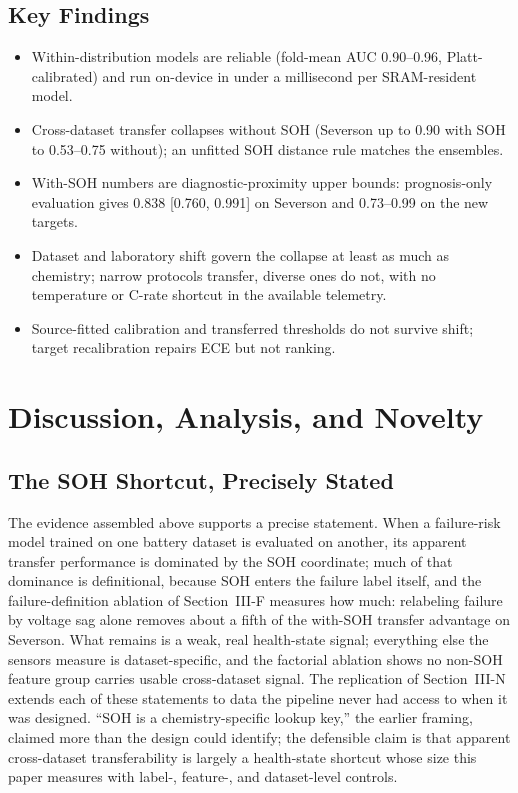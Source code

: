 \documentclass[preprint,12pt]{elsarticle}
\begin{document}
\subsection{Key Findings}
\begin{itemize}
\item Within-distribution models are reliable (fold-mean AUC 0.90--0.96, Platt-calibrated) and run on-device in under a millisecond per SRAM-resident model.
\item Cross-dataset transfer collapses without SOH (Severson up to 0.90 with SOH to 0.53--0.75 without); an unfitted SOH distance rule matches the ensembles.
\item With-SOH numbers are diagnostic-proximity upper bounds: prognosis-only evaluation gives 0.838 [0.760, 0.991] on Severson and 0.73--0.99 on the new targets.
\item Dataset and laboratory shift govern the collapse at least as much as chemistry; narrow protocols transfer, diverse ones do not, with no temperature or C-rate shortcut in the available telemetry.
\item Source-fitted calibration and transferred thresholds do not survive shift; target recalibration repairs ECE but not ranking.
\end{itemize}

\section{Discussion, Analysis, and Novelty}

\subsection{The SOH Shortcut, Precisely Stated}
The evidence assembled above supports a precise statement. When a failure-risk model trained on one battery dataset is evaluated on another, its apparent transfer performance is dominated by the SOH coordinate; much of that dominance is definitional, because SOH enters the failure label itself, and the failure-definition ablation of Section~III-F measures how much: relabeling failure by voltage sag alone removes about a fifth of the with-SOH transfer advantage on Severson. What remains is a weak, real health-state signal; everything else the sensors measure is dataset-specific, and the factorial ablation shows no non-SOH feature group carries usable cross-dataset signal. The replication of Section~III-N extends each of these statements to data the pipeline never had access to when it was designed. ``SOH is a chemistry-specific lookup key,'' the earlier framing, claimed more than the design could identify; the defensible claim is that apparent cross-dataset transferability is largely a health-state shortcut whose size this paper measures with label-, feature-, and dataset-level controls.
\end{document}

